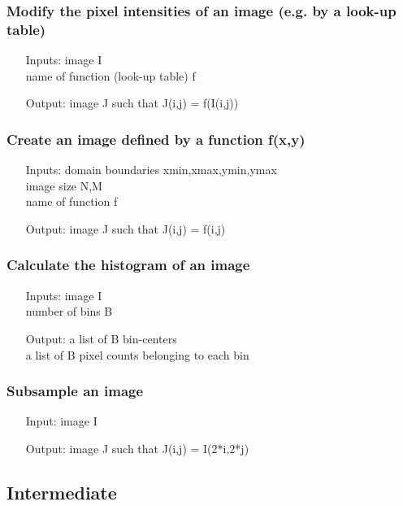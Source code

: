 \documentclass[10pt,a4paper]{article}
\begin{document}
\subsubsection{Modify the pixel intensities of an image (e.g. by a look-up table)}
\begin{itemize}   
\item[Inputs:] image I\\
 name of function (look-up table) f 
\item[Output:] image J such that J(i,j) = f(I(i,j)) 
\end{itemize}       

\subsubsection{Create an image defined by a function f(x,y) }
\begin{itemize}   
\item[Inputs:] domain boundaries xmin,xmax,ymin,ymax\\
  image size N,M\\
  name of function f
\item[Output:] image J such that J(i,j) = f(i,j) 
\end{itemize}   

\subsubsection{Calculate the histogram of an image}
\begin{itemize}   
\item[Inputs:] image I\\
  number of bins B
\item[Output:] a list of B bin-centers\\
  a list of B pixel counts belonging to each bin
\end{itemize}   

\subsubsection{Subsample an image} 
\begin{itemize}     \item[Input:] image I
\item[Output:] image J such that J(i,j) = I(2*i,2*j)
\end{itemize}

\subsection{Intermediate}
\end{document}
